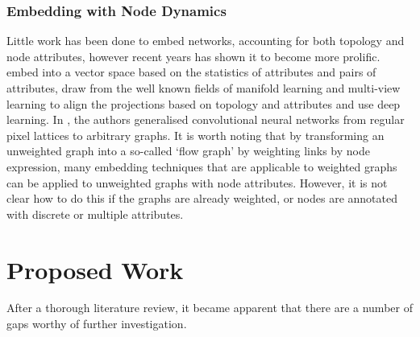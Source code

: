 \documentclass{report}
\begin{document}
	\subsection{Embedding with Node Dynamics}
	Little work has been done to embed networks, accounting for both topology and node attributes, however recent years has shown it to become more prolific. \cite{gibert2012graph} embed into a vector space based on the statistics of attributes and pairs of attributes, \cite{li2017attributed} draw from the well known fields of manifold learning and multi-view learning to align the projections based on topology and attributes and \cite{liao2017attributed} use deep learning. In \cite{niepert2016learning}, the authors generalised convolutional neural networks from regular pixel lattices to arbitrary graphs. It is worth noting that by transforming an unweighted graph into a so-called `flow graph' \cite{ISI:000293452500017} by weighting links by node expression, many embedding techniques that are applicable to weighted graphs can be applied to unweighted graphs with node attributes. However, it is not clear how to do this if the graphs are already weighted, or nodes are annotated with discrete or multiple attributes.
	


	
	\chapter{Proposed Work}
	
	After a thorough literature review, it became apparent that there are a number of gaps worthy of further investigation.
	
\end{document}
